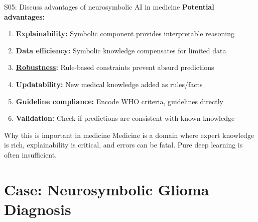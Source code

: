 \documentclass[aspectratio=169, 10pt]{beamer}
\begin{document}
\begin{frame}{S05: Discuss advantages of neurosymbolic AI in medicine}
    \textbf{Potential advantages:}
    
    \vspace{0.3cm}
    \begin{enumerate}
        \item \textbf{\href{https://en.wikipedia.org/wiki/Explainable_artificial_intelligence}{Explainability}:} Symbolic component provides interpretable reasoning
        
        \item \textbf{Data efficiency:} Symbolic knowledge compensates for limited data
        
        \item \textbf{\href{https://en.wikipedia.org/wiki/Robustness_(computer_science)}{Robustness}:} Rule-based constraints prevent absurd predictions
        
        \item \textbf{Updatability:} New medical knowledge added as rules/facts
        
        \item \textbf{Guideline compliance:} Encode WHO criteria, guidelines directly
        
        \item \textbf{Validation:} Check if predictions are consistent with known knowledge
    \end{enumerate}
    
    \vspace{0.3cm}
    \begin{alertblock}{Why this is important in medicine}
        Medicine is a domain where expert knowledge is rich, explainability is critical, and errors can be fatal. Pure deep learning is often insufficient.
    \end{alertblock}
\end{frame}

\section{Case: Neurosymbolic Glioma Diagnosis}
\end{document}
